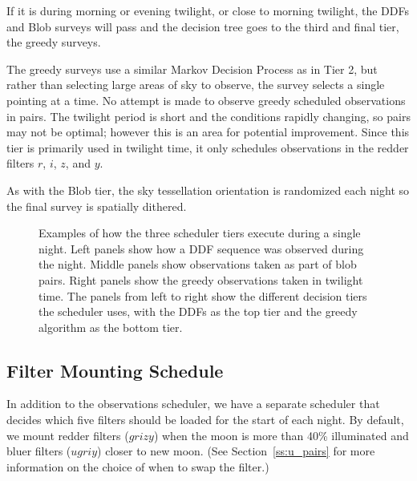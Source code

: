 If it is during morning or evening twilight, or close to morning twilight, the DDFs and Blob surveys will pass and the decision tree goes to the third and final tier, the greedy surveys. 

The greedy surveys use a similar Markov Decision Process as in Tier 2, but rather than selecting large areas of sky to observe, the survey selects a single pointing at a time.  No attempt is made to observe greedy scheduled observations in pairs. The twilight period is short and the conditions rapidly changing, so pairs may not be optimal; however this is an area for potential improvement. Since this tier is primarily used in twilight time, it only schedules observations in the redder filters $r$, $i$, $z$, and $y$.  

As with the Blob tier, the sky tessellation orientation is randomized each night so the final survey is spatially dithered. 



\begin{figure}

\caption{Examples of how the three scheduler tiers execute during a single night. Left panels show how a DDF sequence was observed during the night. Middle panels show observations taken as part of blob pairs. Right panels show the greedy observations taken in twilight time.  The panels from left to right show the different decision tiers the scheduler uses, with the DDFs as the top tier and the greedy algorithm as the bottom tier. } \label{fig:examplenight}
\end{figure}

\subsection{Filter Mounting Schedule}

In addition to the observations scheduler, we have a separate scheduler that decides which five filters should be loaded for the start of each night.  By default, we mount redder filters ($grizy$) when the moon is more than 40\% illuminated and bluer filters ($ugriy$) closer to new moon. (See Section~\ref{ss:u_pairs} for more information on the choice of when to swap the filter.)

